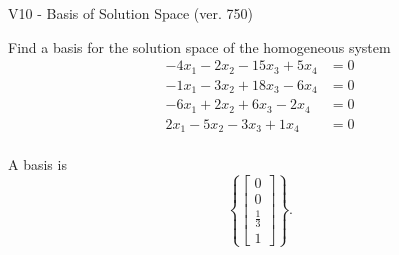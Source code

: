\begin{exercise}
  \begin{exerciseTitle}V10 - Basis of Solution Space (ver. 750)\end{exerciseTitle}
  \begin{exerciseStatement}
    Find a basis for the solution space of the homogeneous system 
\begin{align*}
 -4 x_ 1 -2 x_ 2 -15 x_ 3 + 5 x_ 4 &= 0  \\ 
  -1 x_ 1 -3 x_ 2 + 18 x_ 3 -6 x_ 4 &= 0  \\ 
  -6 x_ 1 + 2 x_ 2 + 6 x_ 3 -2 x_ 4 &= 0  \\ 
  2 x_ 1 -5 x_ 2 -3 x_ 3 + 1 x_ 4 &= 0  \\ 
 \end{align*}


 
  \end{exerciseStatement}

  \begin{exerciseAnswer}
   A basis is   
\[\left\{\left[\begin{array}{c}
0 \\
0 \\
\frac{1}{3} \\
1
\end{array}\right]\right\}.\]

  


  \end{exerciseAnswer}
\end{exercise}